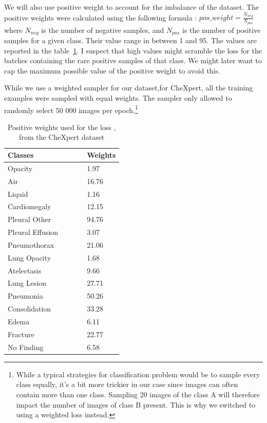 \documentclass[11pt]{article}
\begin{document}
            We will also use positive weight to account for the imbalance of the dataset. The positive weights were calculated using the following formula : $pos\_weight = \frac{N_{neg}}{N_{pos}}$ where $N_{neg}$ is the number of negative samples, and $N_{pos}$ is the number of positive samples for a given class. Their value range
        in between 1 and 95. The values are reported in the table~\ref{table:pos_weight_chexpert}. I suspect that high values might scramble the loss for the batches containing the rare positive samples of that class. We might later want to cap
        the maximum possible value of the positive weight to avoid this.

        While we use a weighted sampler for our dataset,for CheXpert, all the training examples were sampled with equal weights. The sampler only
        allowed to randomly select 50 000 images per epoch.\footnote{While a typical strategies for classification problem would
    be to sample every class equally, it's a bit more trickier in our case since images can often contain more than one class. Sampling 20 images of the class A will therefore impact
    the number of images of class B present. This is why we switched to using a weighted loss instead.}

            \begin{table}[h!]
                \centering
                \begin{tabular}{@{}lllll@{}}
                \toprule
                Classes          & & & & Weights \\ \midrule
                Opacity          & & & & 1.97    \\
                Air              & & & & 16.76   \\
                Liquid           & & & & 1.16    \\
                Cardiomegaly     & & & & 12.15   \\
                Pleural Other    & & & & 94.76   \\
                Pleural Effusion & & & & 3.07    \\
                Pneumothorax     & & & & 21.06   \\
                Lung Opacity     & & & & 1.68    \\
                Atelectasis      & & & & 9.66    \\
                Lung Lesion      & & & & 27.71   \\
                Pneumonia        & & & & 50.26   \\
                Consolidation    & & & & 33.28   \\
                Edema            & & & & 6.11    \\
                Fracture         & & & & 22.77   \\
                No Finding       & & & & 6.58    \\ \bottomrule
                \end{tabular}
                \caption{Positive weights used for the loss , from the CheXpert dataset}
                \label{table:pos_weight_chexpert}
            \end{table}
\end{document}
